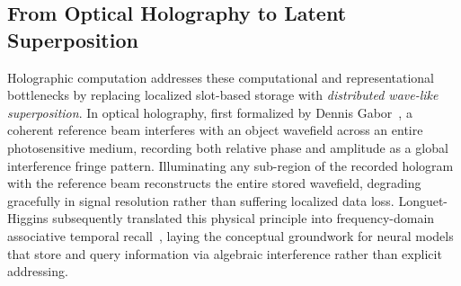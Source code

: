 \subsection{From Optical Holography to Latent Superposition}\label{sec:intro:holography}

Holographic computation addresses these computational and representational bottlenecks by replacing localized slot-based storage with \emph{distributed wave-like superposition}.
In optical holography, first formalized by Dennis Gabor~\cite{GABOR_1948_HOLOGRAPHY}, a coherent reference beam interferes with an object wavefield across an entire photosensitive medium, recording both relative phase and amplitude as a global interference fringe pattern.
Illuminating any sub-region of the recorded hologram with the reference beam reconstructs the entire stored wavefield, degrading gracefully in signal resolution rather than suffering localized data loss.
Longuet-Higgins subsequently translated this physical principle into frequency-domain associative temporal recall~\cite{LONGUET_HIGGINS_1968_HOLOPHONE}, laying the conceptual groundwork for neural models that store and query information via algebraic interference rather than explicit addressing.

